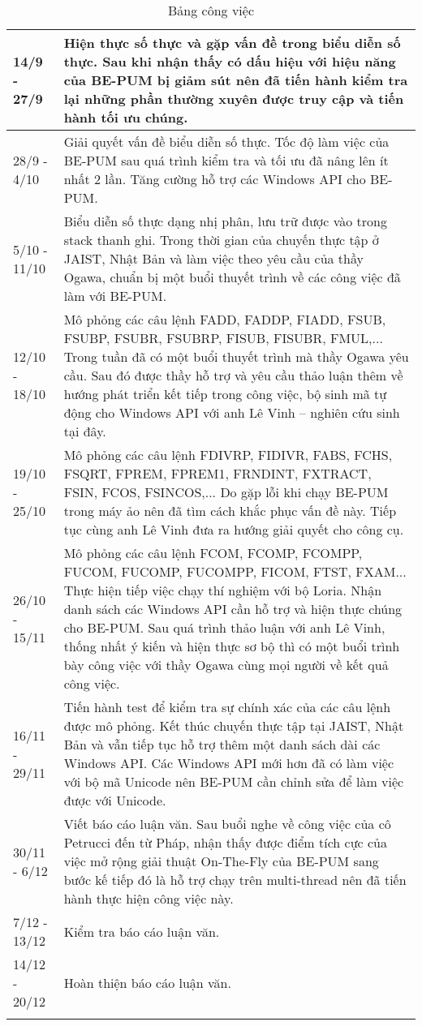 \begin{longtable}{|l|m{11cm}|}
		\hline	
			14/9 - 27/9	& Hiện thực số thực và gặp vấn đề trong biểu diễn số thực. Sau khi nhận thấy có dấu hiệu với hiệu năng của BE-PUM bị giảm sút nên đã tiến hành kiểm tra lại những phần thường xuyên được truy cập và tiến hành tối ưu chúng.\\
		\hline	
			28/9 - 4/10&	Giải quyết vấn đề biểu diễn số thực. Tốc độ làm việc của BE-PUM sau quá trình kiểm tra và tối ưu đã nâng lên ít nhất 2 lần. Tăng cường hỗ trợ các Windows API cho BE-PUM.\\
		\hline	
			5/10 - 11/10&	Biểu diễn số thực dạng nhị phân, lưu trữ được vào trong stack thanh ghi. Trong thời gian của chuyến thực tập ở JAIST, Nhật Bản và làm việc theo yêu cầu của thầy Ogawa, chuẩn bị một buổi thuyết trình về các công việc đã làm với BE-PUM.\\
		\hline	
			12/10 - 18/10&	Mô phỏng các câu lệnh FADD, FADDP, FIADD, FSUB, FSUBP, FSUBR, FSUBRP, FISUB, FISUBR, FMUL,... Trong tuần đã có một buổi thuyết trình mà thầy Ogawa yêu cầu. Sau đó được thầy hỗ trợ và yêu cầu thảo luận thêm về hướng phát triển kết tiếp trong công việc, bộ sinh mã tự động cho Windows API với anh Lê Vinh -- nghiên cứu sinh tại đây.\\
		\hline	
			19/10 - 25/10&	Mô phỏng các câu lệnh  FDIVRP, FIDIVR, FABS, FCHS, FSQRT, FPREM, FPREM1, FRNDINT, FXTRACT, FSIN, FCOS, FSINCOS,... Do gặp lỗi khi chạy BE-PUM trong máy ảo nên đã tìm cách khắc phục vấn đề này. Tiếp tục cùng anh Lê Vinh đưa ra hướng giải quyết cho công cụ.\\
		\hline
			26/10 - 15/11	& Mô phỏng các câu lệnh FCOM, FCOMP, FCOMPP, FUCOM, FUCOMP, FUCOMPP, FICOM,  FTST, FXAM... Thực hiện tiếp việc chạy thí nghiệm với bộ Loria. Nhận danh sách các Windows API cần hỗ trợ và hiện thực chúng cho BE-PUM. Sau quá trình thảo luận với anh Lê Vinh, thống nhất ý kiến và hiện thực sơ bộ thì có một buổi trình bày công việc với thầy Ogawa cùng mọi người về kết quả công việc.\\		
		\hline	
			16/11 - 29/11&	Tiến hành test để kiểm tra sự chính xác của các câu lệnh được mô phỏng. Kết thúc chuyến thực tập tại JAIST, Nhật Bản và vẫn tiếp tục hỗ trợ thêm một danh sách dài các Windows API. Các Windows API mới hơn đã có làm việc với bộ mã Unicode nên BE-PUM cần chỉnh sửa để làm việc được với Unicode.\\
		\hline	
			30/11 - 6/12	& Viết báo cáo luận văn. Sau buổi nghe về công việc của cô Petrucci đến từ Pháp, nhận thấy được điểm tích cực của việc mở rộng giải thuật On-The-Fly của BE-PUM sang bước kế tiếp đó là hỗ trợ chạy trên multi-thread nên đã tiến hành thực hiện công việc này.\\
		\hline	
			7/12 - 13/12	& Kiểm tra báo cáo luận văn.\\
		\hline	
			14/12 - 20/12&	Hoàn thiện báo cáo luận văn.\\
		\hline
			\caption{Bảng công việc}			
			
	\end{longtable}